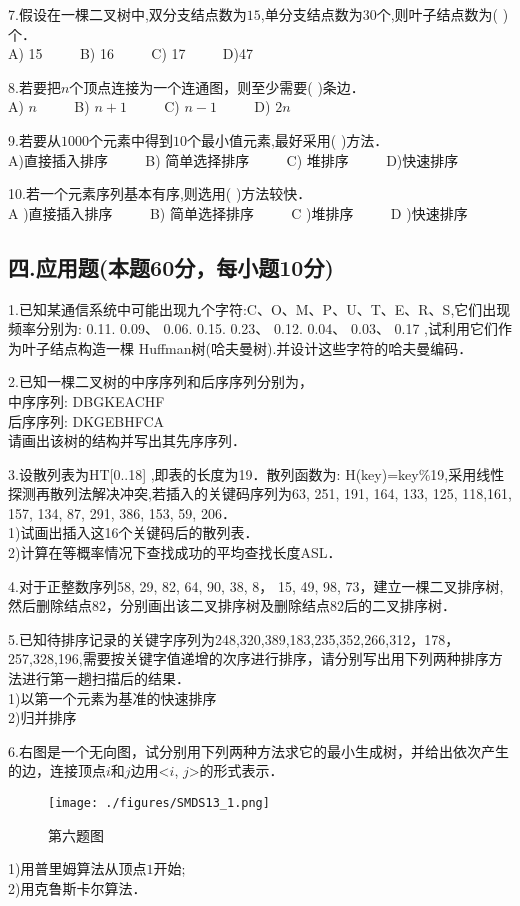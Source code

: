 7.假设在一棵二叉树中,双分支结点数为$15$,单分支结点数为$30$个,则叶子结点数为(  )个． \\
A) 15 $\qquad$ B) 16 $\qquad$ C) 17 $\qquad$ D)47

8.若要把$n$个顶点连接为一个连通图，则至少需要(   )条边． \\
A) $n$ $\qquad$ B) $n+1$ $\qquad$ C) $n-1$ $\qquad$ D) $2n$

9.若要从$1000$个元素中得到$10$个最小值元素,最好采用(    )方法． \\
A)直接插入排序 $\qquad$ B) 简单选择排序 $\qquad$ C) 堆排序 $\qquad$ D)快速排序

10.若一个元素序列基本有序,则选用(  )方法较快． \\
A )直接插入排序 $\qquad$ B) 简单选择排序 $\qquad$ C )堆排序 $\qquad$ D )快速排序

\subsection{四.应用题(本题60分，每小题10分)}

1.已知某通信系统中可能出现九个字符:C、O、M、P、U、T、E、R、S,它们出现频率分别为: 0.11. 0.09、 0.06. 0.15. 0.23、 0.12. 0.04、 0.03、 0.17 ,试利用它们作为叶子结点构造一棵 Huffman树(哈夫曼树).并设计这些字符的哈夫曼编码．

2.已知一棵二叉树的中序序列和后序序列分别为， \\
中序序列: DBGKEACHF \\
后序序列: DKGEBHFCA \\
请画出该树的结构并写出其先序序列．

3.设散列表为HT[0..18] ,即表的长度为19．散列函数为: H(key)=key\%19,采用线性探测再散列法解决冲突,若插入的关键码序列为{63, 251, 191, 164, 133, 125, 118,161, 157, 134, 87, 291, 386, 153, 59, 206}． \\
1)试画出插入这16个关键码后的散列表． \\
2)计算在等概率情况下查找成功的平均查找长度ASL．

4.对于正整数序列{58, 29, 82, 64, 90, 38, 8， 15, 49, 98, 73}，建立一棵二叉排序树,然后删除结点$82$，分别画出该二叉排序树及删除结点$82$后的二叉排序树．

5.已知待排序记录的关键字序列为{248,320,389,183,235,352,266,312，178，257,328,196},需要按关键字值递增的次序进行排序，请分别写出用下列两种排序方法进行第一趟扫描后的结果． \\
1)以第一个元素为基准的快速排序 \\
2)归并排序

6.右图是一个无向图，试分别用下列两种方法求它的最小生成树，并给出依次产生的边，连接顶点$i$和$j$边用<$i$, $j$>的形式表示．
\begin{figure}[ht]
\centering
\texttt{[image: ./figures/SMDS13\_1.png]}
\caption{第六题图} \label{SMDS13_fig1}
\end{figure}
1)用普里姆算法从顶点$1$开始; \\
2)用克鲁斯卡尔算法．

